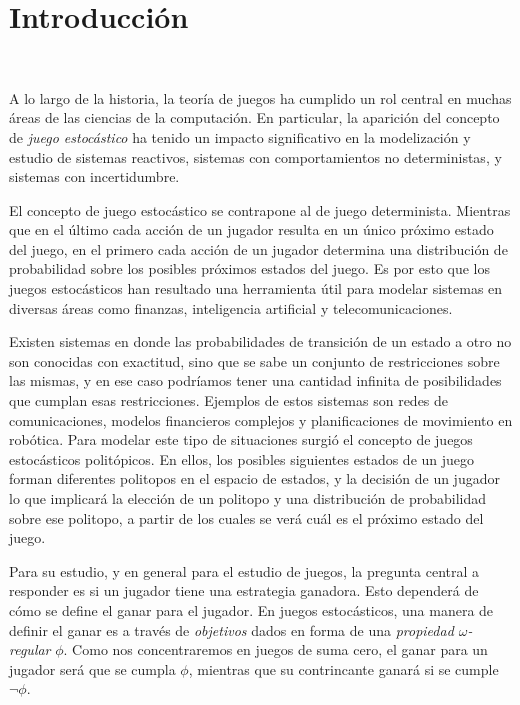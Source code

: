 \chapter{Introducción}
~\label{cap:intro}
\vspace{-1cm}

A lo largo de la historia, la teoría de juegos ha cumplido un rol central en
muchas áreas de las ciencias de la computación. En particular, la aparición del
concepto de \textit{juego estocástico} ha tenido un impacto significativo en la
modelización y estudio de sistemas reactivos, sistemas con comportamientos no
deterministas, y sistemas con incertidumbre.

El concepto de juego estocástico se contrapone al de juego determinista.
Mientras que en el último cada acción de un jugador resulta en un único próximo
estado del juego, en el primero cada acción de un jugador determina una
distribución de probabilidad sobre los posibles próximos estados del juego. Es
por esto que los juegos estocásticos han resultado una herramienta útil para
modelar sistemas en diversas áreas como finanzas, inteligencia artificial y
telecomunicaciones.

Existen sistemas en donde las probabilidades de transición de un estado a otro
no son conocidas con exactitud, sino que se sabe un conjunto de restricciones
sobre las mismas, y en ese caso podríamos tener una cantidad infinita de
posibilidades que cumplan esas restricciones. Ejemplos de estos sistemas son
redes de comunicaciones, modelos financieros complejos y planificaciones de
movimiento en robótica. Para modelar este tipo de situaciones surgió el
concepto de juegos estocásticos politópicos. En ellos, los posibles siguientes
estados de un juego forman diferentes politopos en el espacio de estados, y la
decisión de un jugador lo que implicará la elección de un politopo y una
distribución de probabilidad sobre ese politopo, a partir de los cuales se verá
cuál es el próximo estado del juego.

Para su estudio, y en general para el estudio de juegos, la pregunta central a
responder es si un jugador tiene una estrategia ganadora. Esto dependerá de
cómo se define el ganar para el jugador. En juegos estocásticos, una manera de
definir el ganar es a través de \textit{objetivos} dados en forma de una
\textit{propiedad $\omega$-regular} $\phi$. Como nos concentraremos en juegos
de suma cero, el ganar para un jugador será que se cumpla $\phi$, mientras que
su contrincante ganará si se cumple $\neg \phi$.


